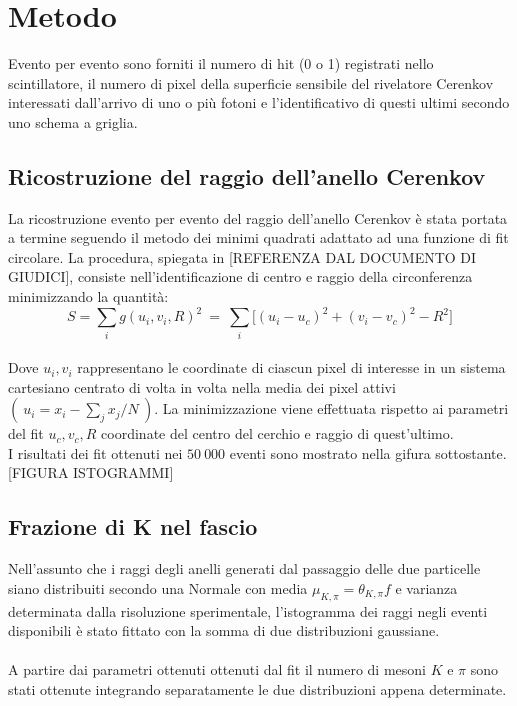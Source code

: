 \documentclass[8pt]{extarticle}
\begin{document}
\section{Metodo}
Evento per evento sono forniti il numero di hit (0 o 1) registrati nello scintillatore, il numero di pixel della superficie sensibile del rivelatore Cerenkov interessati dall'arrivo di uno o più fotoni e l'identificativo di questi ultimi secondo uno schema a griglia.\\
\subsection{Ricostruzione del raggio dell'anello Cerenkov}
La ricostruzione evento per evento del raggio dell'anello Cerenkov è stata portata a termine seguendo il metodo dei minimi quadrati adattato ad una funzione di fit circolare. La procedura, spiegata in [REFERENZA DAL DOCUMENTO DI GIUDICI], consiste nell'identificazione di centro e raggio della circonferenza minimizzando la quantità:
\begin{equation}
S=\sum_i g(u_i, v_i, R)^2 \ = \ \sum_i \Big[ (u_i-u_c)^2+(v_i-v_c)^2 - R^2 \Big]
\end{equation}
\\
Dove $u_i, v_i$ rappresentano le coordinate di ciascun pixel di interesse in un sistema cartesiano centrato di volta in volta nella media dei pixel attivi $( \ u_i=x_i-\sum_j x_j /N\ )$. La minimizzazione viene effettuata rispetto ai parametri del fit $u_c, v_c, R$ coordinate del centro del cerchio e raggio di quest'ultimo.\\
I risultati dei fit ottenuti nei $50\ 000$ eventi sono mostrato nella gifura sottostante. [FIGURA ISTOGRAMMI]
\subsection{Frazione di K nel fascio}
Nell'assunto che i raggi degli anelli generati dal passaggio delle due particelle siano distribuiti secondo una Normale con media $\mu_{K,\pi}=\theta_{K,\pi}f$ e varianza determinata dalla risoluzione sperimentale, l'istogramma dei raggi negli eventi disponibili è stato fittato con la somma di due distribuzioni gaussiane.\\
\\
A partire dai parametri ottenuti ottenuti dal fit il numero di mesoni $K$ e $\pi$ sono stati ottenute integrando separatamente le due distribuzioni appena determinate.\\
\end{document}
